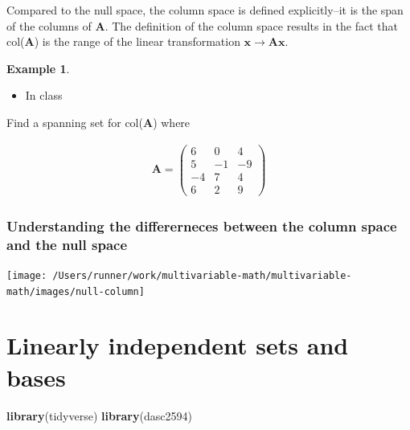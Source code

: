 \documentclass[
]{book}
\newenvironment{Shaded}{\begin{snugshade}}{\end{snugshade}}
\newcommand{\KeywordTok}[1]{\textcolor[rgb]{0.13,0.29,0.53}{\textbf{#1}}}
\newcommand{\NormalTok}[1]{#1}
\providecommand{\tightlist}{%
  \setlength{\itemsep}{0pt}\setlength{\parskip}{0pt}}
\theoremstyle{definition}
\theoremstyle{definition}
\newtheorem{example}{Example}[chapter]
\theoremstyle{definition}
\theoremstyle{remark}
\begin{document}
Compared to the null space, the column space is defined explicitly--it is the span of the columns of \(\mathbf{A}\). The definition of the column space results in the fact that col(\(\mathbf{A}\)) is the range of the linear transformation \(\mathbf{x} \rightarrow \mathbf{A} \mathbf{x}\).

\begin{example}
\protect\hypertarget{exm:unlabeled-div-125}{}\label{exm:unlabeled-div-125}

\begin{itemize}
\tightlist
\item
  In class
\end{itemize}

Find a spanning set for col(\(\mathbf{A}\)) where

\[
\begin{aligned}
\mathbf{A} = \begin{pmatrix} 6 & 0 & 4 \\ 5 & -1 & -9 \\ -4 & 7 & 4 \\ 6 & 2 & 9 \end{pmatrix}
\end{aligned}
\]

\end{example}

\hypertarget{understanding-the-differerneces-between-the-column-space-and-the-null-space}{%
\subsection{Understanding the differerneces between the column space and the null space}\label{understanding-the-differerneces-between-the-column-space-and-the-null-space}}

\texttt{[image: /Users/runner/work/multivariable-math/multivariable-math/images/null-column]}

\hypertarget{linearly-independent-sets-and-bases}{%
\chapter{Linearly independent sets and bases}\label{linearly-independent-sets-and-bases}}

\begin{Shaded}
\begin{Highlighting}[]
\KeywordTok{library}\NormalTok{(tidyverse)}
\KeywordTok{library}\NormalTok{(dasc2594)}
\end{Highlighting}
\end{Shaded}
\end{document}
